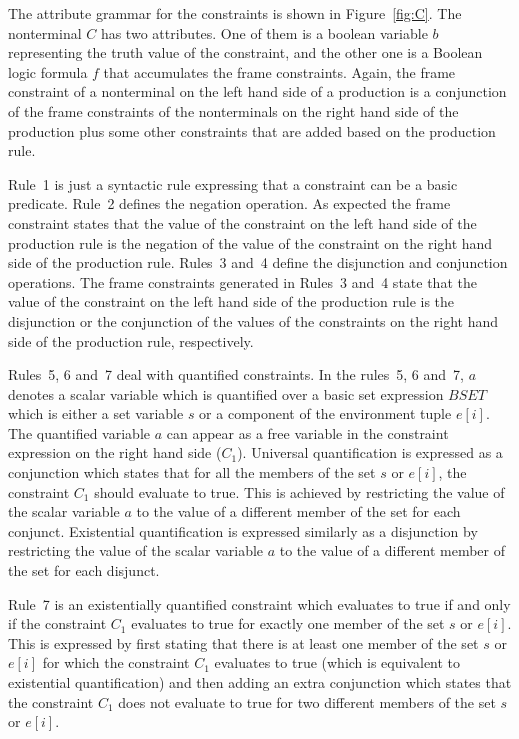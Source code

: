 The attribute grammar for the constraints is shown in
Figure~\ref{fig:C}.  The nonterminal $C$ has two attributes.  One of
them is a boolean variable $b$ representing the truth value of the
constraint, and the other one is a Boolean logic formula $f$ that
accumulates the frame constraints.  Again, the frame constraint of a
nonterminal on the left hand side of a production is a conjunction of
the frame constraints of the nonterminals on the right hand side of
the production plus some other constraints that are added based on the
production rule.

Rule~1 is just a syntactic rule expressing that a constraint can be a
basic predicate.  Rule~2 defines the negation operation.  As expected
the frame constraint states that the value of the constraint on the
left hand side of the production rule is the negation of the value of
the constraint on the right hand side of the production rule.  Rules~3
and~4 define the disjunction and conjunction operations.  The frame
constraints generated in Rules~3 and~4 state that the value of the
constraint on the left hand side of the production rule is the
disjunction or the conjunction of the values of the constraints on the
right hand side of the production rule, respectively.

Rules~5, 6 and~7 deal with quantified constraints.  In the rules~5, 6
and~7, $a$ denotes a scalar variable which is quantified over a basic
set expression $BSET$ which is either a set variable $s$ or a
component of the environment tuple $e[i]$.  The quantified variable
$a$ can appear as a free variable in the constraint expression on the
right hand side ($C_1$).  Universal quantification is expressed as a
conjunction which states that for all the members of the set $s$ or
$e[i]$, the constraint $C_1$ should evaluate to true.  This is
achieved by restricting the value of the scalar variable $a$ to the
value of a different member of the set for each conjunct.  Existential
quantification is expressed similarly as a disjunction by restricting
the value of the scalar variable $a$ to the value of a different
member of the set for each disjunct.

Rule~7 is an existentially quantified constraint which evaluates to
true if and only if the constraint $C_1$ evaluates to true for exactly
one member of the set $s$ or $e[i]$.  This is expressed by first
stating that there is at least one member of the set $s$ or $e[i]$ for
which the constraint $C_1$ evaluates to true (which is equivalent to
existential quantification) and then adding an extra conjunction which
states that the constraint $C_1$ does not evaluate to true for two
different members of the set $s$ or $e[i]$.

